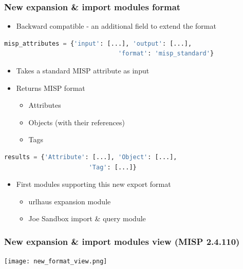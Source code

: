 \begin{frame}[fragile]
    \frametitle{New expansion \& import modules format}
    \begin{itemize}
        \item Backward compatible - an additional field to extend the format
    \end{itemize}
    \begin{adjustbox}{width=\textwidth,height=5cm,keepaspectratio}
        \begin{lstlisting}[language=python]
            misp_attributes = {'input': [...], 'output': [...],
                               'format': 'misp_standard'}
        \end{lstlisting}
    \end{adjustbox}
    \begin{itemize}
        \item Takes a standard MISP attribute as input
        \item Returns MISP format
        \begin{itemize}
            \item Attributes
            \item Objects (with their references)
            \item Tags
        \end{itemize}
    \end{itemize}
    \begin{adjustbox}{width=\textwidth,height=5cm,keepaspectratio}
        \begin{lstlisting}[language=python]
            results = {'Attribute': [...], 'Object': [...],
                       'Tag': [...]}
        \end{lstlisting}
    \end{adjustbox}
    \begin{itemize}
        \item First modules supporting this new export format
            \begin{itemize}
                \item urlhaus expansion module
                \item Joe Sandbox import \& query module
            \end{itemize}
    \end{itemize}
\end{frame}

\begin{frame}[fragile]
        \frametitle{New expansion \& import modules view (MISP 2.4.110)}
    \texttt{[image: new\_format\_view.png]}
\end{frame}


